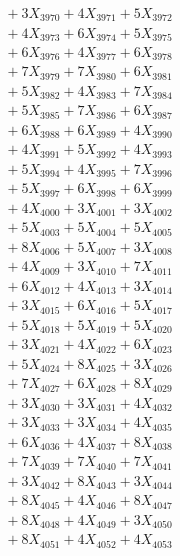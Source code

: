 \documentclass[a4paper,10pt]{article}
\begin{document}
{\begin{align}
&\;  + 3 X_{3970} + 4 X_{3971} + 5 X_{3972} \\[0.3ex]
&\;  + 4 X_{3973} + 6 X_{3974} + 5 X_{3975} \\[0.3ex]
&\;  + 6 X_{3976} + 4 X_{3977} + 6 X_{3978} \\[0.3ex]
&\;  + 7 X_{3979} + 7 X_{3980} + 6 X_{3981} \\[0.3ex]
&\;  + 5 X_{3982} + 4 X_{3983} + 7 X_{3984} \\[0.3ex]
&\;  + 5 X_{3985} + 7 X_{3986} + 6 X_{3987} \\[0.3ex]
&\;  + 6 X_{3988} + 6 X_{3989} + 4 X_{3990} \\[0.3ex]
&\;  + 4 X_{3991} + 5 X_{3992} + 4 X_{3993} \\[0.3ex]
&\;  + 5 X_{3994} + 4 X_{3995} + 7 X_{3996} \\[0.3ex]
&\;  + 5 X_{3997} + 6 X_{3998} + 6 X_{3999} \\[0.5ex]\allowbreak
&\;  + 4 X_{4000} + 3 X_{4001} + 3 X_{4002} \\[0.3ex]
&\;  + 5 X_{4003} + 5 X_{4004} + 5 X_{4005} \\[0.3ex]
&\;  + 8 X_{4006} + 5 X_{4007} + 3 X_{4008} \\[0.3ex]
&\;  + 4 X_{4009} + 3 X_{4010} + 7 X_{4011} \\[0.3ex]
&\;  + 6 X_{4012} + 4 X_{4013} + 3 X_{4014} \\[0.3ex]
&\;  + 3 X_{4015} + 6 X_{4016} + 5 X_{4017} \\[0.3ex]
&\;  + 5 X_{4018} + 5 X_{4019} + 5 X_{4020} \\[0.3ex]
&\;  + 3 X_{4021} + 4 X_{4022} + 6 X_{4023} \\[0.3ex]
&\;  + 5 X_{4024} + 8 X_{4025} + 3 X_{4026} \\[0.3ex]
&\;  + 7 X_{4027} + 6 X_{4028} + 8 X_{4029} \\[0.5ex]\allowbreak
&\;  + 3 X_{4030} + 3 X_{4031} + 4 X_{4032} \\[0.3ex]
&\;  + 3 X_{4033} + 3 X_{4034} + 4 X_{4035} \\[0.3ex]
&\;  + 6 X_{4036} + 4 X_{4037} + 8 X_{4038} \\[0.3ex]
&\;  + 7 X_{4039} + 7 X_{4040} + 7 X_{4041} \\[0.3ex]
&\;  + 3 X_{4042} + 8 X_{4043} + 3 X_{4044} \\[0.3ex]
&\;  + 8 X_{4045} + 4 X_{4046} + 8 X_{4047} \\[0.3ex]
&\;  + 8 X_{4048} + 4 X_{4049} + 3 X_{4050} \\[0.3ex]
&\;  + 8 X_{4051} + 4 X_{4052} + 4 X_{4053} \\[0.3ex]

\end{align}}
\end{document}
